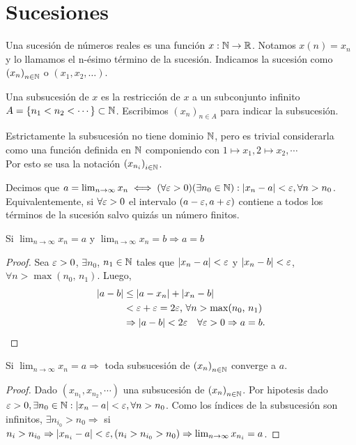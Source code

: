 \section{Sucesiones}

Una sucesión de números reales es una función \(x: \mathbb{N} \to \mathbb{R} \).
Notamos \(x(n) = x_n\) y lo llamamos el n-ésimo término de la sucesión.
Indicamos la sucesión como \({(x_n)}_{n \in \mathbb{N}} \) o \((x_1, x_2, \ldots)\).

Una subsucesión de \(x\) es la restricción de \(x\) a un subconjunto infinito \(A = \{ n_1 < n_2 < \cdots \} \subset \mathbb{N} \).
Escribimos \({(x_n)}_{n \in A} \) para indicar la subsucesión.

\begin{note}
  Estrictamente la subsucesión no tiene dominio \(\mathbb{N} \), pero es trivial considerarla como una función definida en \(\mathbb{N} \) componiendo con \(1 \mapsto x_1, 2 \mapsto x_2, \cdots \) \\
  Por esto se usa la notación \({(x_{n_i})}_{i \in \mathbb{N}} \).
\end{note}

\begin{definition}
  Decimos que \(a = \lim_{n \to \infty} x_n \iff (\forall \varepsilon > 0)(\exists n_0 \in \mathbb{N}) : |x_n - a| < \varepsilon, \forall n > n_0\). \\
  Equivalentemente, si \(\forall \varepsilon > 0\) el intervalo \((a-\varepsilon, a+\varepsilon)\) contiene a todos los términos de la sucesión salvo quizás un número finitos.
\end{definition}

\begin{theorem}
  Si \(\lim_{n \to \infty} x_n = a\) y \(\lim_{n \to \infty} x_n = b \Rightarrow a=b\)
  \begin{proof}
    Sea \(\varepsilon > 0\), \(\exists n_0\), \(n_1 \in \mathbb{N} \) tales que \(|x_n - a| < \varepsilon \) y \(|x_n - b| < \varepsilon \), \(\forall n > \max(n_0\text{, } n_1)\). Luego, \begin{align*}
      |a - b| & \leq |a - x_n| + |x_n - b|                                        \\
              & < \varepsilon + \varepsilon = 2\varepsilon\text{, } \forall n > \max(n_0\text{, } n_1)       \\
              & \Rightarrow |a - b| < 2\varepsilon \quad \forall \varepsilon > 0 \Rightarrow a = b.
    \end{align*}
  \end{proof}
\end{theorem}

\begin{theorem}
  Si \(\lim_{n \to \infty} x_n = a \Rightarrow \) toda subsucesión de \({(x_n)}_{n \in \mathbb{N}} \) converge a \(a\).
  \begin{proof}
    Dado \((x_{n_1}, x_{n_2}, \cdots)\) una subsucesión de \({(x_n)}_{n \in \mathbb{N}} \). Por hipotesis dado \(\varepsilon > 0, \exists n_0 \in \mathbb{N} : |x_n - a| < \varepsilon, \forall n > n_0\). Como los índices de la subsucesión son infinitos, \(\exists n_{i_0} > n_0 \Rightarrow \) si \(n_i > n_{i_0} \Rightarrow |x_{n_i} - a| < \varepsilon, (n_i > n_{i_0} > n_0) \Rightarrow \lim_{n \to \infty} x_{n_i} = a\).
  \end{proof}
\end{theorem}

